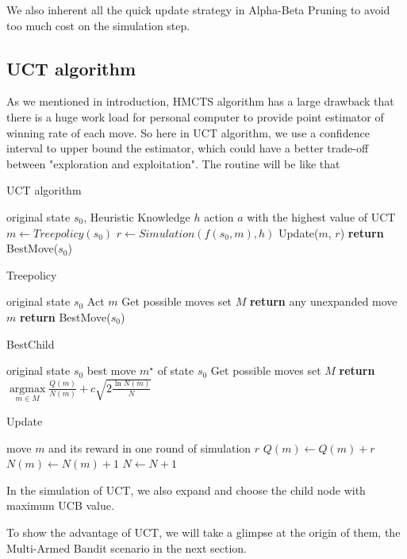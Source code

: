\documentclass[a4paper, 11pt]{article} %
\begin{document}
\begin{multicols}{2}
	We also inherent all the quick update strategy in Alpha-Beta Pruning to avoid too much cost on the simulation step.
	
	\subsection{UCT algorithm}

	As we mentioned in introduction, HMCTS algorithm has a large drawback that there is a huge work load for personal computer to provide point estimator of winning rate of each move. So here in UCT algorithm, we use a confidence interval to upper bound the estimator, which could have a better trade-off between "exploration and exploitation". The routine will be like that
	
	\begin{algorithm}[H]
		\caption{UCT algorithm}
		\begin{algorithmic}[1]
			\Require original state $s_0$, Heuristic Knowledge $h$
			\Ensure action $a$ with the highest value of UCT
				\State $m \gets Tree policy(s_0)$
				\State $r \gets Simulation(f(s_0, m), h)$
				\State Update($m$, $r$)
			\EndWhile
			\State \textbf{return} BestMove($s_0$)
		\end{algorithmic}
	\end{algorithm}

	\begin{algorithm}[H]
		\caption{Treepolicy}
		\begin{algorithmic}[1]
			\Require original state $s_0$
			\Ensure Act $m$
			\State Get possible moves set $M$
				\State \textbf{return} any unexpanded move $m$
			\Else
				\State \textbf{return} BestMove($s_0$)
			\EndIf
		\end{algorithmic}
	\end{algorithm}
	
	\begin{algorithm}[H]
		\caption{BestChild}
		\begin{algorithmic}[1]
			\Require original state $s_0$
			\Ensure best move $m^\star$ of state $s_0$
			\State Get possible moves set $M$
			\State \textbf{return} $\mathop{\arg \max}\limits_{m \in M}\frac{Q(m)}{N(m)} + c\sqrt{2\frac{\ln N(m)}{N}}$
		\end{algorithmic}
	\end{algorithm}

	\begin{algorithm}[H]
		\caption{Update}
		\begin{algorithmic}[1]
			\Require move $m$ and its reward in one round of simulation $r$
			\State $Q(m) \gets Q(m) + r$
			\State $N(m) \gets N(m) + 1$
			\State $N \gets N + 1$
		\end{algorithmic}
	\end{algorithm}
	
	In the simulation of UCT, we also expand and choose the child node with maximum UCB value.
	
	To show the advantage of UCT, we will take a glimpse at the origin of them, the Multi-Armed Bandit scenario in the next section.
	
	\end{multicols}
\end{document}
